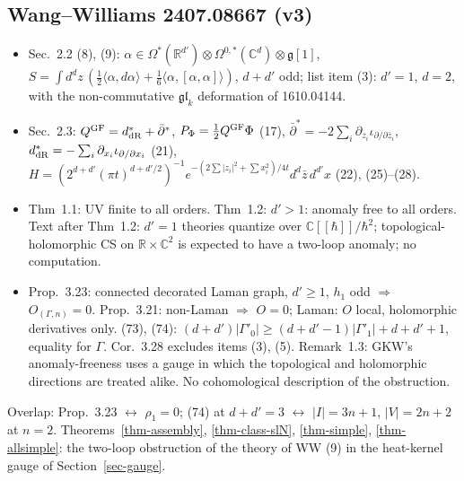 \documentclass[10pt,a4paper]{article}
\numberwithin{equation}{section}
\theoremstyle{definition}
\theoremstyle{remark}
\newcommand{\g}{\mathfrak g}
\newcommand{\fgl}{\mathfrak{gl}}
\newcommand{\dbar}{\bar\partial}
\newcommand{\zb}{\bar z}
\begin{document}
\subsection{Wang--Williams 2407.08667 (v3)}
\begin{itemize}\itemsep1pt
\item Sec.~2.2 (8), (9): $\alpha\in\Omega^*(\mathbb R^{d'})\otimes\Omega^{0,*}(\mathbb C^d)\otimes\g[1]$, $S=\int d^dz\,(\frac12\langle\alpha,d\alpha\rangle+\frac16\langle\alpha,[\alpha,\alpha]\rangle)$, $d+d'$ odd; list item (3): $d'=1$, $d=2$, with the non-commutative $\fgl_k$ deformation of 1610.04144.
\item Sec.~2.3: $Q^{\rm GF}=d^*_{\rm dR}+\dbar^*$, $P_\Phi=\frac12Q^{\rm GF}\Phi$ (17), $\dbar^*=-2\sum_i\partial_{z_i}\iota_{\partial/\partial\zb_i}$, $d^*_{\rm dR}=-\sum_i\partial_{x_i}\iota_{\partial/\partial x_i}$ (21), $H=(2^{d+d'}(\pi t)^{d+d'/2})^{-1}e^{-(2\sum|z_i|^2+\sum x_i^2)/4t}d^d\zb\,d^{d'}x$ (22), (25)--(28).
\item Thm~1.1: UV finite to all orders. Thm~1.2: $d'>1$: anomaly free to all orders. Text after Thm~1.2: $d'=1$ theories quantize over $\mathbb C[[\hbar]]/\hbar^2$; topological-holomorphic CS on $\mathbb R\times\mathbb C^2$ is expected to have a two-loop anomaly; no computation.
\item Prop.~3.23: connected decorated Laman graph, $d'\ge1$, $h_1$ odd $\Rightarrow$ $O_{(\Gamma,n)}=0$. Prop.~3.21: non-Laman $\Rightarrow$ $O=0$; Laman: $O$ local, holomorphic derivatives only. (73), (74): $(d+d')|\Gamma'_0|\ge(d+d'-1)|\Gamma'_1|+d+d'+1$, equality for $\Gamma$. Cor.~3.28 excludes items (3), (5). Remark~1.3: GKW's anomaly-freeness uses a gauge in which the topological and holomorphic directions are treated alike. No cohomological description of the obstruction.
\end{itemize}
Overlap: Prop.~3.23 $\leftrightarrow$ $\rho_1=0$; (74) at $d+d'=3$ $\leftrightarrow$ $|I|=3n+1$, $|V|=2n+2$ at $n=2$. Theorems~\ref{thm-assembly}, \ref{thm-class-slN}, \ref{thm-simple}, \ref{thm-allsimple}: the two-loop obstruction of the theory of WW (9) in the heat-kernel gauge of Section~\ref{sec-gauge}.
\end{document}
